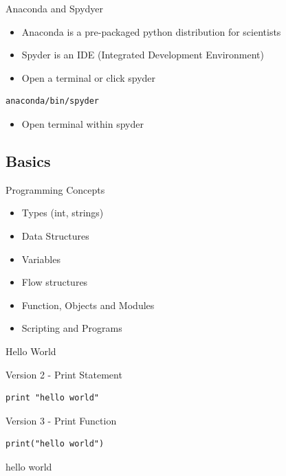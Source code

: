 \documentclass[presentation]{beamer}
\begin{document}
\begin{frame}[fragile,label=sec-4-0-1]{Anaconda and Spydyer}
 \begin{itemize}
\item Anaconda is a pre-packaged python distribution for scientists
\item Spyder is an IDE (Integrated Development Environment)
\item Open a terminal or click spyder
\end{itemize}

\lstset{numbers=left,language=sh,label= ,caption= }
\begin{lstlisting}
anaconda/bin/spyder
\end{lstlisting}

\begin{itemize}
\item Open terminal within spyder
\end{itemize}
\end{frame}


\subsection{Basics}
\label{sec-4-1}

\begin{frame}[label=sec-4-1-1]{Programming Concepts}
\begin{itemize}
\item Types (int, strings)
\item Data Structures
\item Variables
\item Flow structures
\item Function, Objects and Modules
\item Scripting and Programs
\end{itemize}
\end{frame}


\begin{frame}[fragile,label=sec-4-1-2]{Hello World}
 \begin{block}{Version 2 - Print Statement}
\lstset{numbers=left,language=Python,label= ,caption= }
\begin{lstlisting}
print "hello world"
\end{lstlisting}
\end{block}

\begin{block}{Version 3 - Print Function}
\lstset{numbers=left,language=Python,label= ,caption= }
\begin{lstlisting}
print("hello world")
\end{lstlisting}
hello world
\end{block}

\end{frame}
\end{document}
